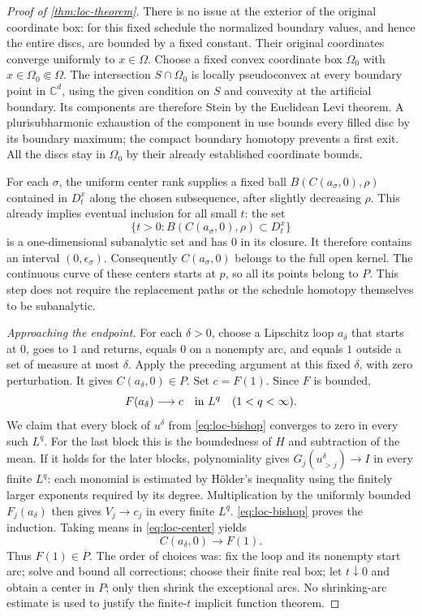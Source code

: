 \begin{proof}[Proof of \cref{thm:loc-theorem}]
There is no issue at the exterior of the original coordinate box: for this fixed schedule the normalized boundary values, and hence the entire discs, are bounded by a fixed constant.  Their original coordinates converge uniformly to $x\in\Omega$.  Choose a fixed convex coordinate box $\Omega_0$ with $x\in\Omega_0\Subset\Omega$. The intersection $S\cap\Omega_0$ is locally pseudoconvex at every boundary point in $\mathbb{C}^d$, using the given condition on $S$ and convexity at the artificial boundary.  Its components are therefore Stein by the Euclidean Levi theorem.  A plurisubharmonic exhaustion of the component in use bounds every filled disc by its boundary maximum; the compact boundary homotopy prevents a first exit.  All the discs stay in $\Omega_0$ by their already established coordinate bounds.

For each $\sigma$, the uniform center rank supplies a fixed ball $B(C(a_\sigma,0),\rho)$ contained in $D_t^x$ along the chosen subsequence, after slightly decreasing $\rho$.  This already implies eventual inclusion for all small $t$: the set
\[
 \{t>0:B(C(a_\sigma,0),\rho)\subset D_t^x\}
\]
is a one-dimensional subanalytic set and has $0$ in its closure. It therefore contains an interval $(0,\epsilon_\sigma)$. Consequently $C(a_\sigma,0)$ belongs to the full open kernel.  The continuous curve of these centers starts at $p$, so all its points belong to $P$.  This step does not require the replacement paths or the schedule homotopy themselves to be subanalytic.

\emph{Approaching the endpoint.} For each $\delta>0$, choose a Lipschitz loop $a_\delta$ that starts at $0$, goes to $1$ and returns, equals $0$ on a nonempty arc, and equals $1$ outside a set of measure at most $\delta$.  Apply the preceding argument at this fixed $\delta$, with zero perturbation.  It gives $C(a_\delta,0)\in P$.  Set $c=F(1)$.  Since $F$ is bounded,
\[
 F(a_\delta)\longrightarrow c\quad\hbox{in }L^q
                            \quad(1<q<\infty).
\]
We claim that every block of $u^\delta$ from \eqref{eq:loc-bishop} converges to zero in every such $L^q$.  For the last block this is the boundedness of $H$ and subtraction of the mean.  If it holds for the later blocks, polynomiality gives $G_j(u_{>j}^\delta)\to I$ in every finite $L^q$: each monomial is estimated by H\"older's inequality using the finitely larger exponents required by its degree.  Multiplication by the uniformly bounded $F_j(a_\delta)$ then gives $V_j\to c_j$ in every finite $L^q$.  \eqref{eq:loc-bishop} proves the induction.  Taking means in \eqref{eq:loc-center} yields
\[
                         C(a_\delta,0)\longrightarrow F(1).
\]
Thus $F(1)\in\overline P$.  The order of choices was: fix the loop and its nonempty start arc; solve and bound all corrections; choose their finite real box; let $t\downarrow0$ and obtain a center in $P$; only then shrink the exceptional arcs.  No shrinking-arc estimate is used to justify the finite-$t$ implicit function theorem.


\end{proof}

